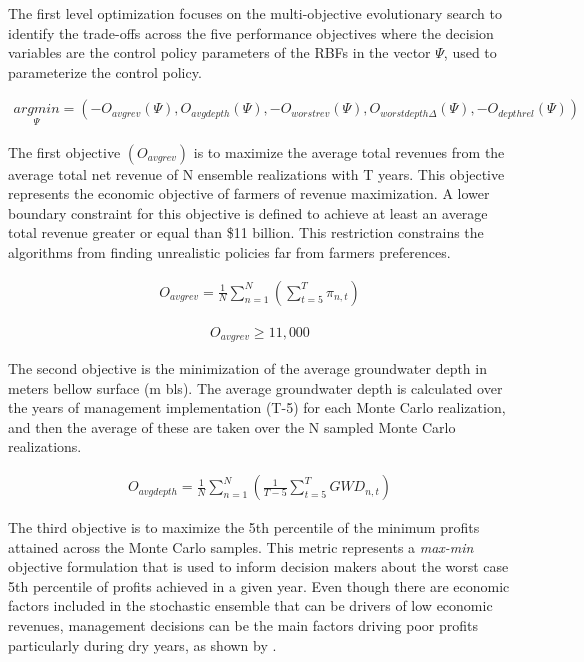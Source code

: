 \documentclass[a4paper,fleqn]{cas-sc}
\begin{document}
The first level optimization focuses on the multi-objective evolutionary search to identify the trade-offs across the five performance objectives where the decision variables are the control policy parameters of the RBFs in the vector $\Psi$, used to parameterize the control policy. 

\begin{align}
\underset{\Psi}{argmin} = (-O_{avgrev}(\Psi),O_{avgdepth}(\Psi),-O_{worstrev}(\Psi),O_{worstdepth\Delta}(\Psi),-O_{depthrel}(\Psi))
\end{align}

The first objective $(O_{avgrev})$ is to maximize the average total revenues  from the average total net revenue of N ensemble realizations with T years. This objective represents the economic objective of farmers of revenue maximization. A lower boundary constraint for this objective is defined to achieve at least an average total revenue greater or equal than \$11 billion. This restriction constrains the algorithms from finding unrealistic policies far from farmers preferences. 

\begin{align}
O_{avgrev} = \frac{1}{N}\sum_{n=1}^N(\sum_{t=5}^T \pi_{n,t})
\end{align}


\begin{align}
O_{avgrev} \geq 11,000
\end{align}

The second objective is the minimization of the average groundwater depth in meters bellow surface (m bls). The average groundwater depth is calculated over the years of management implementation (T-5) for each Monte Carlo realization, and then the average of these are taken over the N sampled Monte Carlo realizations. 

\begin{align}
O_{avgdepth} = \frac{1}{N}\sum_{n=1}^N(\frac{1}{T-5}\sum_{t=5}^T GWD_{n,t})
\end{align}

The third objective is to maximize the 5th percentile of the minimum profits attained across the Monte Carlo samples. This metric represents a \textit{max-min} objective formulation that is used to inform decision makers about the worst case 5th percentile of profits achieved in a given year. Even though there are economic factors included in the stochastic ensemble that can be drivers of low economic revenues, management decisions can be the main factors driving poor profits particularly during dry years, as shown by \citet{rodriguez-flores_global_2022}. 
\end{document}
